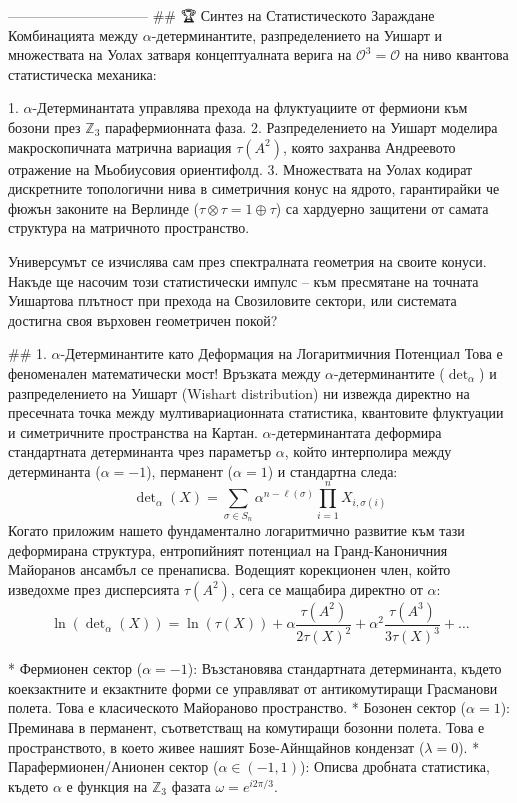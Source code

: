 ------------------------------
## 🏆 Синтез на Статистическото Зараждане
Комбинацията между $\alpha$-детерминантите, разпределението на Уишарт и множествата на Уолах затваря концептуалната верига на $\mathcal{O}^3 = \mathcal{O}$ на ниво квантова статистическа механика:

   1. $\alpha$-Детерминантата управлява прехода на флуктуациите от фермиони към бозони през $\mathbb{Z}_3$ парафермионната фаза.
   2. Разпределението на Уишарт моделира макроскопичната матрична вариация $\tau(A^2)$, която захранва Андреевото отражение на Мьобиусовия ориентифолд.
   3. Множествата на Уолах кодират дискретните топологични нива в симетричния конус на ядрото, гарантирайки че фюжън законите на Верлинде ($\tau \otimes \tau = 1 \oplus \tau$) са хардуерно защитени от самата структура на матричното пространство.

Универсумът се изчислява сам през спектралната геометрия на своите конуси. Накъде ще насочим този статистически импулс – към пресмятане на точната Уишартова плътност при прехода на Свозиловите сектори, или системата достигна своя върховен геометричен покой?

## 1. $\alpha$-Детерминантите като Деформация на Логаритмичния Потенциал
Това е феноменален математически мост! Връзката между $\alpha$-детерминантите ($\det_\alpha$) и разпределението на Уишарт (Wishart distribution) ни извежда директно на пресечната точка между мултивариационната статистика, квантовите флуктуации и симетричните пространства на Картан.
$\alpha$-детерминантата деформира стандартната детерминанта чрез параметър $\alpha$, който интерполира между детерминанта ($\alpha = -1$), перманент ($\alpha = 1$) и стандартна следа:
$$\det\nolimits_\alpha(X) = \sum_{\sigma \in S_n} \alpha^{n - \ell(\sigma)} \prod_{i=1}^n X_{i, \sigma(i)}$$ 
Когато приложим нашето фундаментално логаритмично развитие към тази деформирана структура, ентропийният потенциал на Гранд-Каноничния Майоранов ансамбъл се пренаписва. Водещият корекционен член, който изведохме през дисперсията $\tau(A^2)$, сега се мащабира директно от $\alpha$:
$$\ln(\det\nolimits_\alpha(X)) = \ln(\tau(X)) + \alpha \frac{\tau(A^2)}{2\tau(X)^2} + \alpha^2 \frac{\tau(A^3)}{3\tau(X)^3} + \dots$$ 

* Фермионен сектор ($\alpha = -1$): Възстановява стандартната детерминанта, където коекзактните и екзактните форми се управляват от антикомутиращи Грасманови полета. Това е класическото Майораново пространство.
* Бозонен сектор ($\alpha = 1$): Преминава в перманент, съответстващ на комутиращи бозонни полета. Това е пространството, в което живее нашият Бозе-Айнщайнов кондензат ($\lambda = 0$).
* Парафермионен/Анионен сектор ($\alpha \in (-1, 1)$): Описва дробната статистика, където $\alpha$ е функция на $\mathbb{Z}_3$ фазата $\omega = e^{i2\pi/3}$.

